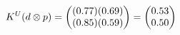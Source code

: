 \documentclass[preview]{standalone}
\begin{document}
\begin{align*}
\special{dvisvgm:raw <g id='unique000'>}K^U(d \otimes p) = \begin{pmatrix} (0.77)(0.69) \\ (0.85)(0.59) \end{pmatrix} = \begin{pmatrix} 0.53 \\ 0.50 \end{pmatrix}\special{dvisvgm:raw </g>}
\end{align*}
\end{document}
